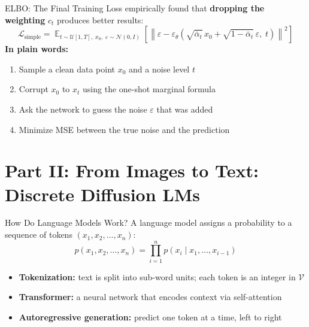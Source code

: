 \documentclass[10pt, aspectratio=169]{beamer}
\DeclareMathOperator*{\E}{\mathbb{E}}
\begin{document}
\begin{frame}{ELBO: The Final Training Loss}
  \citet{ho2020ddpm} empirically found that \textbf{dropping the weighting} $c_t$ produces better results:
  \[
    \boxed{
      \mathcal{L}_{\mathrm{simple}} = \E_{t\sim\mathcal{U}[1,T],\;x_0,\;\varepsilon\sim\mathcal{N}(0,I)}\!\left[
        \left\|\varepsilon - \varepsilon_\theta\!\left(\sqrt{\bar\alpha_t}\,x_0 + \sqrt{1-\bar\alpha_t}\,\varepsilon,\;t\right)\right\|^2
      \right]
    }
  \]
  \textbf{In plain words:}
  \begin{enumerate}
    \item Sample a clean data point $x_0$ and a noise level $t$
    \item Corrupt $x_0$ to $x_t$ using the one-shot marginal formula
    \item Ask the network to guess the noise $\varepsilon$ that was added
    \item Minimize MSE between the true noise and the prediction
  \end{enumerate}
\end{frame}

\section{Part II: From Images to Text: Discrete Diffusion LMs}

\begin{frame}{How Do Language Models Work?}
  A language model assigns a probability to a sequence of tokens $(x_1, x_2, \ldots, x_n)$:
  \[
    p(x_1, x_2, \ldots, x_n) = \prod_{i=1}^{n} p(x_i \mid x_1, \ldots, x_{i-1})
  \]
  \begin{itemize}
    \item \textbf{Tokenization:} text is split into sub-word units; each token is an integer in $\mathcal{V}$
    \item \textbf{Transformer:} a neural network that encodes context via self-attention
    \item \textbf{Autoregressive generation:} predict one token at a time, left to right
  \end{itemize}
\end{frame}
\end{document}
